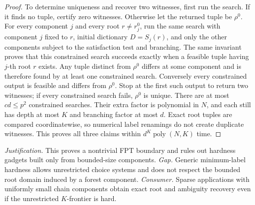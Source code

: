 \documentclass{article}
\begin{document}
\begin{proof}
To determine uniqueness and recover two witnesses, first run the search.  If it finds no tuple, certify zero witnesses.  Otherwise let the returned tuple be \(\rho^0\).  For every component \(j\) and every root \(r\ne r_j^0\), run the same search with component \(j\) fixed to \(r\), initial dictionary \(D=S_j(r)\), and only the other components subject to the satisfaction test and branching.  The same invariant proves that this constrained search succeeds exactly when a feasible tuple having \(j\)-th root \(r\) exists.  Any tuple distinct from \(\rho^0\) differs at some component and is therefore found by at least one constrained search.  Conversely every constrained output is feasible and differs from \(\rho^0\).  Stop at the first such output to return two witnesses; if every constrained search fails, \(\rho^0\) is unique.  There are at most \(cd\le p^2\) constrained searches.  Their extra factor is polynomial in \(N\), and each still has depth at most \(K\) and branching factor at most \(d\).  Exact root tuples are compared coordinatewise, so numerical label renamings do not create duplicate witnesses.  This proves all three claims within \(d^K\operatorname{poly}(N,K)\) time.
\end{proof}
\par\smallskip\noindent \textit{Justification.} This proves a nontrivial FPT boundary and rules out hardness gadgets built only from bounded-size components. \textit{Gap.} Generic minimum-label hardness allows unrestricted choice systems and does not respect the bounded root domain induced by a forest component. \textit{Consumer.} Sparse applications with uniformly small chain components obtain exact root and ambiguity recovery even if the unrestricted \(K\)-frontier is hard.
\end{document}
